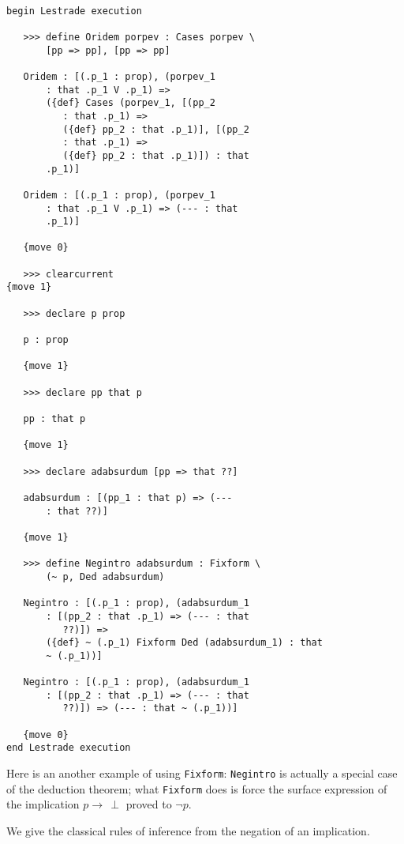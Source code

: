 \documentclass[12pt]{article}
\begin{document}
\begin{verbatim}

begin Lestrade execution

   >>> define Oridem porpev : Cases porpev \
       [pp => pp], [pp => pp]

   Oridem : [(.p_1 : prop), (porpev_1 
       : that .p_1 V .p_1) => 
       ({def} Cases (porpev_1, [(pp_2 
          : that .p_1) => 
          ({def} pp_2 : that .p_1)], [(pp_2 
          : that .p_1) => 
          ({def} pp_2 : that .p_1)]) : that 
       .p_1)]

   Oridem : [(.p_1 : prop), (porpev_1 
       : that .p_1 V .p_1) => (--- : that 
       .p_1)]

   {move 0}

   >>> clearcurrent
{move 1}

   >>> declare p prop

   p : prop

   {move 1}

   >>> declare pp that p

   pp : that p

   {move 1}

   >>> declare adabsurdum [pp => that ??]

   adabsurdum : [(pp_1 : that p) => (--- 
       : that ??)]

   {move 1}

   >>> define Negintro adabsurdum : Fixform \
       (~ p, Ded adabsurdum)

   Negintro : [(.p_1 : prop), (adabsurdum_1 
       : [(pp_2 : that .p_1) => (--- : that 
          ??)]) => 
       ({def} ~ (.p_1) Fixform Ded (adabsurdum_1) : that 
       ~ (.p_1))]

   Negintro : [(.p_1 : prop), (adabsurdum_1 
       : [(pp_2 : that .p_1) => (--- : that 
          ??)]) => (--- : that ~ (.p_1))]

   {move 0}
end Lestrade execution
\end{verbatim}


Here is an another example of using {\tt Fixform}:  {\tt Negintro} is actually a special case of the deduction theorem;  what {\tt Fixform} does is force the surface expression of the implication
$p \rightarrow \, \perp$ proved to $\neg p$.

We give the classical rules of inference from the negation of an implication.
\end{document}
